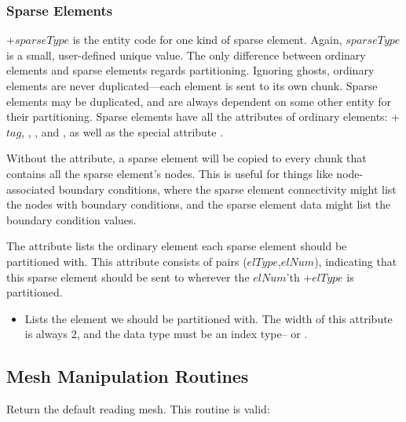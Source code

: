 \subsubsection{Sparse Elements}
+$sparseType$ is the entity code for one kind of sparse element.
Again, $sparseType$ is a small, user-defined unique value.
The only difference between ordinary elements and sparse elements 
regards partitioning.  Ignoring ghosts, ordinary elements are never duplicated---each
element is sent to its own chunk.  Sparse elements may be duplicated,
and are always dependent on some other entity for their partitioning.
Sparse elements have all the attributes of ordinary elements:
+$tag$, , ,
and , as well as the special attribute .

Without the  attribute, a sparse element will 
be copied to every chunk that contains all the sparse element's nodes.  
This is useful for things like node-associated boundary conditions, 
where the sparse element connectivity might list the nodes with boundary
conditions, and the sparse element data might list the boundary condition values.

The  attribute lists the ordinary element each 
sparse element should be partitioned with.  This attribute consists of 
pairs ($elType$,$elNum$), indicating that this sparse element
should be sent to wherever the $elNum$'th +$elType$ 
is partitioned.


\begin{itemize}
\item {} Lists the element we should be partitioned with.
    The width of this attribute is always 2, and the data type must
    be an index type-- or .
\end{itemize}



\subsection{Mesh Manipulation Routines}



Return the default reading mesh.  This routine is valid:

